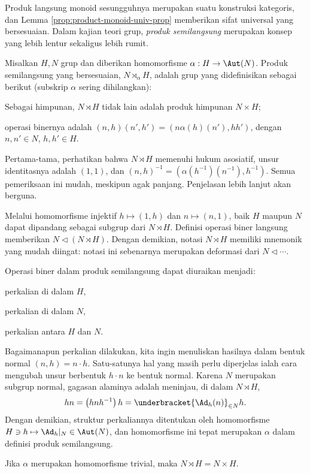 Produk langsung monoid sesungguhnya merupakan suatu konstruksi kategoris, dan Lemma \ref{prop:product-monoid-univ-prop} memberikan sifat universal yang bersesuaian. Dalam kajian teori grup, \emph{produk semilangsung} merupakan konsep yang lebih lentur sekaligus lebih rumit.

\begin{definition}
	Misalkan $H, N$ grup dan diberikan homomorfisme $\alpha: H \to \Aut(N)$. Produk semilangsung yang bersesuaian, $N \rtimes_{\alpha} H$, adalah grup yang didefinisikan sebagai berikut (subskrip $\alpha$ sering dihilangkan):
	\begin{compactitem}
		\item Sebagai himpunan, $N \rtimes H$ tidak lain adalah produk himpunan $N \times H$;
		\item operasi binernya adalah $(n, h)(n', h') = (n \alpha(h)(n'), hh')$, dengan $n,n' \in N$, $h,h' \in H$.
	\end{compactitem}
\end{definition}

Pertama-tama, perhatikan bahwa $N \rtimes H$ memenuhi hukum asosiatif, unsur identitasnya adalah $(1,1)$, dan $(n,h)^{-1} = (\alpha(h^{-1})(n^{-1}), h^{-1})$. Semua pemeriksaan ini mudah, meskipun agak panjang. Penjelasan lebih lanjut akan berguna.
\begin{compactenum}
	\item Melalui homomorfisme injektif $h \mapsto (1, h)$ dan $n \mapsto (n,1)$, baik $H$ maupun $N$ dapat dipandang sebagai subgrup dari $N \rtimes H$. Definisi operasi biner langsung memberikan $N \lhd (N \rtimes H)$. Dengan demikian, notasi $N \rtimes H$ memiliki mnemonik yang mudah diingat: notasi ini sebenarnya merupakan deformasi dari $N \lhd \cdots$.
	\item Operasi biner dalam produk semilangsung dapat diuraikan menjadi:
    \begin{inparaenum}
		\item perkalian di dalam $H$,
		\item perkalian di dalam $N$,
		\item perkalian antara $H$ dan $N$.
	\end{inparaenum}
	Bagaimanapun perkalian dilakukan, kita ingin menuliskan hasilnya dalam bentuk normal $(n, h) = n \cdot h$. Satu-satunya hal yang masih perlu diperjelas ialah cara mengubah unsur berbentuk $h \cdot n$ ke bentuk normal. Karena $N$ merupakan subgrup normal, gagasan alaminya adalah meninjau, di dalam $N \rtimes H$,
	\begin{gather}\label{eqn:semidirect-multiplication}
		hn = \left( h n h^{-1} \right) h = \underbracket{\Ad_h(n)}_{\in N} h.
	\end{gather}
	Dengan demikian, struktur perkaliannya ditentukan oleh homomorfisme $H \ni h \mapsto \Ad_h|_N \in \Aut(N)$, dan homomorfisme ini tepat merupakan $\alpha$ dalam definisi produk semilangsung.
	\item Jika $\alpha$ merupakan homomorfisme trivial, maka $N \rtimes H = N \times H$.
\end{compactenum}

